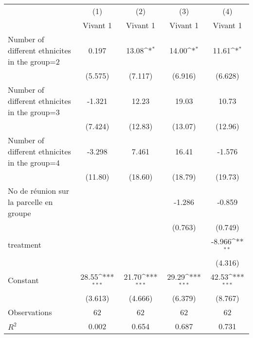 {
\def\sym#1{\ifmmode^{#1}\else\(^{#1}\)\fi}
\begin{tabular}{l*{4}{c}}
\hline\hline
                    &\multicolumn{1}{c}{(1)}&\multicolumn{1}{c}{(2)}&\multicolumn{1}{c}{(3)}&\multicolumn{1}{c}{(4)}\\
                    &\multicolumn{1}{c}{Vivant 1}&\multicolumn{1}{c}{Vivant 1}&\multicolumn{1}{c}{Vivant 1}&\multicolumn{1}{c}{Vivant 1}\\
\hline
Number of different ethnicites in the group=2&       0.197         &       13.08\sym{*}  &       14.00\sym{*}  &       11.61\sym{*}  \\
                    &     (5.575)         &     (7.117)         &     (6.916)         &     (6.628)         \\
[1em]
Number of different ethnicites in the group=3&      -1.321         &       12.23         &       19.03         &       10.73         \\
                    &     (7.424)         &     (12.83)         &     (13.07)         &     (12.96)         \\
[1em]
Number of different ethnicites in the group=4&      -3.298         &       7.461         &       16.41         &      -1.576         \\
                    &     (11.80)         &     (18.60)         &     (18.79)         &     (19.73)         \\
[1em]
No de réunion sur la parcelle en groupe&                     &                     &      -1.286         &      -0.859         \\
                    &                     &                     &     (0.763)         &     (0.749)         \\
[1em]
treatment           &                     &                     &                     &      -8.966\sym{**} \\
                    &                     &                     &                     &     (4.316)         \\
[1em]
Constant            &       28.55\sym{***}&       21.70\sym{***}&       29.29\sym{***}&       42.53\sym{***}\\
                    &     (3.613)         &     (4.666)         &     (6.379)         &     (8.767)         \\
\hline
Observations        &          62         &          62         &          62         &          62         \\
\(R^{2}\)           &       0.002         &       0.654         &       0.687         &       0.731         \\

\end{tabular}}
